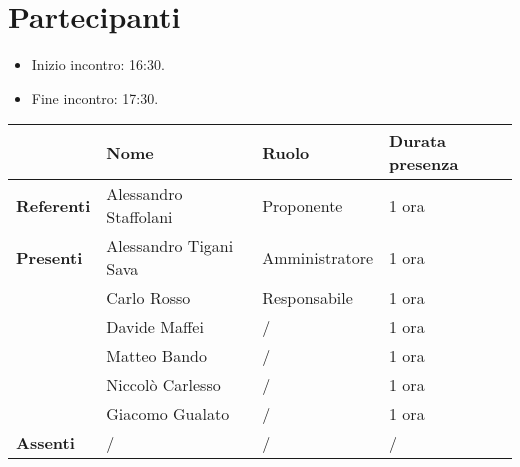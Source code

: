 \section*{Partecipanti}

\begin{itemize}
	\item Inizio incontro: 16:30.
	\item Fine incontro: 17:30.
\end{itemize}


\begin{center}
	{\renewcommand{\arraystretch}{1.5}
		\begin{tabular}{l|lll}
			                   & \textbf{Nome}          & \textbf{Ruolo} & \textbf{Durata presenza} \\
			\hline
			\textbf{Referenti} & Alessandro Staffolani  & Proponente     & 1 ora					\\
			\hline
			\textbf{Presenti}  & Alessandro Tigani Sava & Amministratore & 1 ora                   	\\
			                   & Carlo Rosso            & Responsabile   & 1 ora                   	\\
			                   & Davide Maffei          & /				 & 1 ora                   	\\
			                   & Matteo Bando           & /				 & 1 ora                   	\\
			                   & Niccolò Carlesso       & /				 & 1 ora                   	\\
							   & Giacomo Gualato		& /				 & 1 ora                   	\\
			\hline
			\textbf{Assenti}   & /						& /				 & /                        \\
		\end{tabular}
	}
\end{center}
